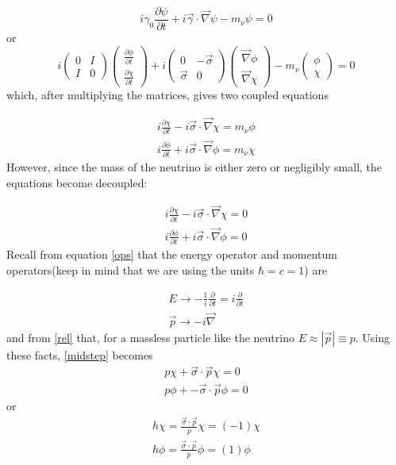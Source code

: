 \documentclass[a4paper,12pt]{book}
\begin{document}
\begin{equation}
 i\gamma_{0}\frac{\partial\psi}{\partial t}+i\vec{\gamma}\cdot \vec{\nabla}\psi-m_{\nu}\psi=0
\end{equation}
or
\begin{equation}
 i\left( \begin{array}{cc}
0 & I \\
I & 0 \end{array} \right) \left( \begin{array}{c}
\frac{\partial\phi}{\partial t} \\
\frac{\partial\chi}{\partial t} \end{array} \right)+i\left( \begin{array}{cc}
0 & -\vec{\sigma} \\
\vec{\sigma} & 0 \end{array} \right) \left( \begin{array}{c}
\vec{\nabla}\phi \\
\vec{\nabla}\chi \end{array} \right)-m_{\nu}
\left( \begin{array}{c}
\phi \\
\chi \end{array} \right)=0
\end{equation}
which, after multiplying the matrices, gives two coupled equations

\begin{align}
 i\frac{\partial\chi}{\partial t}-i\vec{\sigma}\cdot \vec{\nabla}\chi=m_{\nu}\phi \\
 i\frac{\partial\phi}{\partial t}+i\vec{\sigma}\cdot \vec{\nabla}\phi=m_{\nu}\chi
\end{align}
However, since the mass of the neutrino is either zero or negligibly small, the equations become decoupled:

\begin{align}\label{midstep}
 i\frac{\partial\chi}{\partial t}-i\vec{\sigma}\cdot \vec{\nabla}\chi=0 \\
 i\frac{\partial\phi}{\partial t}+i\vec{\sigma}\cdot \vec{\nabla}\phi=0
\end{align}
Recall from equation \ref{ops} that the energy operator and momentum operators(keep in mind that we are using the units $\hbar=c=1$) are 

\begin{align}
E \rightarrow -\frac{1}{i} \frac{\partial}{\partial t}= i\frac{\partial}{\partial t} \\
\vec{p} \rightarrow -i\vec{\nabla}
\end{align}
and from \ref{rel} that, for a massless particle like the neutrino $E\approx \left|\vec{p}\right|\equiv p$.
Using these facts, \ref{midstep} becomes
\begin{align}
 p\chi+\vec{\sigma}\cdot \vec{p}\chi=0 \\
 p\phi+-\vec{\sigma}\cdot \vec{p}\phi=0
\end{align}
or
\begin{align}\label{twocomp}
 h\chi=\frac{\vec{\sigma}\cdot \vec{p}}{p}\chi=(-1)\chi \\
 h\phi= \frac{\vec{\sigma}\cdot \vec{p}}{p}\phi=(1)\phi
\end{align}
\end{document}
